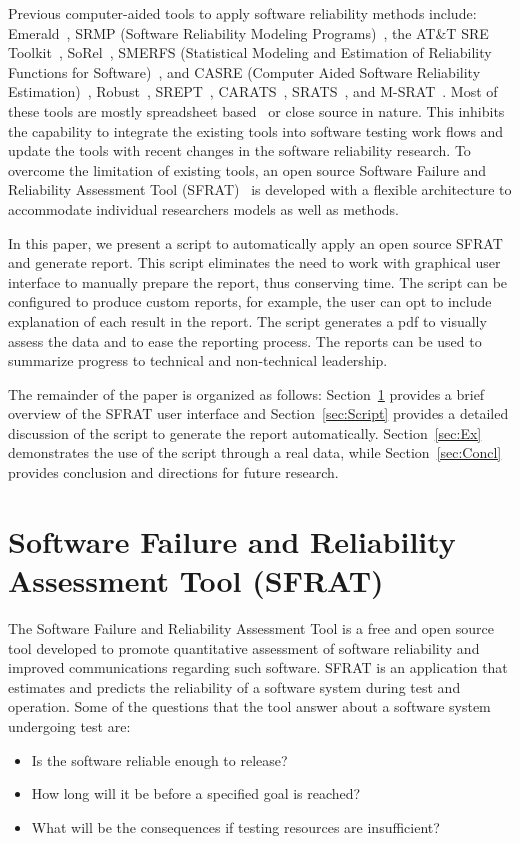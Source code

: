 \documentclass[conference]{IEEEtran}
\begin{document}
Previous computer-aided tools to apply software reliability methods include: Emerald~\cite{1996hudepohlemerald}, SRMP (Software Reliability Modeling Programs)~\cite{1988SRMP}, the AT\&T SRE Toolkit~\cite{1990ATT}, SoRel~\cite{1993kanounsorel}, SMERFS (Statistical Modeling and Estimation of Reliability Functions for Software)~\cite{trSMERFS}, and CASRE (Computer Aided Software Reliability Estimation)~\cite{lyu1992casre}, Robust~\cite{1995lirobust}, SREPT~\cite{2000ramanisrept}, CARATS~\cite{2011huangestimation}, SRATS~\cite{inProcISSRE2013_100}, and M-SRAT~\cite{2015shibatam}. Most of these tools are mostly spreadsheet based~\cite{inProcISSRE2013_100} or close source in nature. This inhibits the capability to integrate the existing tools into software testing work flows and update the tools with recent changes in the software reliability research. To overcome the limitation of existing tools, an open source Software Failure and Reliability Assessment Tool (SFRAT)~\cite{cFio53} is developed with a flexible architecture to accommodate individual researchers models as well as methods.

In this paper, we present a script to automatically apply an open source SFRAT and generate report. This script eliminates the need to work with graphical user interface to manually prepare the report, thus conserving time. The script can be configured to produce custom reports, for example, the user can opt to include explanation of each result in the report. The script generates a pdf to visually assess the data and to ease the reporting process. The reports can be used to summarize progress to technical and non-technical leadership.

The remainder of the paper is organized as follows: Section~\ref{sec:SFRAT} provides a brief overview of the SFRAT user interface and Section~\ref{sec:Script} provides a detailed discussion of the script to generate the report automatically. Section~\ref{sec:Ex} demonstrates the use of the script through a real data, while Section~\ref{sec:Concl} provides conclusion and directions for future research.


\section{Software Failure and Reliability Assessment Tool (SFRAT)}\label{sec:SFRAT}
The Software Failure and Reliability Assessment Tool is a free and open source tool developed to promote quantitative assessment of software reliability and improved communications regarding such software. SFRAT is an application that estimates and predicts the reliability of a software system during test and operation. Some of the questions that the tool answer about a software system undergoing test are:
\begin{itemize}
\item {Is the software reliable enough to release?}
\item {How long will it be before a specified goal is reached?}
\item {What will be the consequences if testing resources are insufficient?}
\end{itemize}
\end{document}
